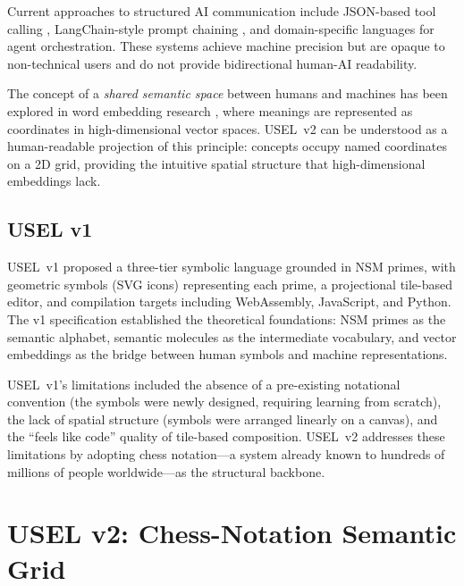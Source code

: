 \documentclass[11pt,a4paper]{article}
\begin{document}
Current approaches to structured AI communication include JSON-based tool calling \citep{openai2023function}, LangChain-style prompt chaining \citep{chase2022langchain}, and domain-specific languages for agent orchestration. These systems achieve machine precision but are opaque to non-technical users and do not provide bidirectional human-AI readability.

The concept of a \emph{shared semantic space} between humans and machines has been explored in word embedding research \citep{mikolov2013efficient, pennington2014glove}, where meanings are represented as coordinates in high-dimensional vector spaces. USEL~v2 can be understood as a human-readable projection of this principle: concepts occupy named coordinates on a 2D grid, providing the intuitive spatial structure that high-dimensional embeddings lack.

\subsection{USEL v1}
\label{sec:usel-v1}

USEL~v1 \citep{olivas2026usel} proposed a three-tier symbolic language grounded in NSM primes, with geometric symbols (SVG icons) representing each prime, a projectional tile-based editor, and compilation targets including WebAssembly, JavaScript, and Python. The v1 specification established the theoretical foundations: NSM primes as the semantic alphabet, semantic molecules as the intermediate vocabulary, and vector embeddings as the bridge between human symbols and machine representations.

USEL~v1's limitations included the absence of a pre-existing notational convention (the symbols were newly designed, requiring learning from scratch), the lack of spatial structure (symbols were arranged linearly on a canvas), and the ``feels like code'' quality of tile-based composition. USEL~v2 addresses these limitations by adopting chess notation---a system already known to hundreds of millions of people worldwide---as the structural backbone.

\section{USEL v2: Chess-Notation Semantic Grid}
\label{sec:usel-v2}
\end{document}
